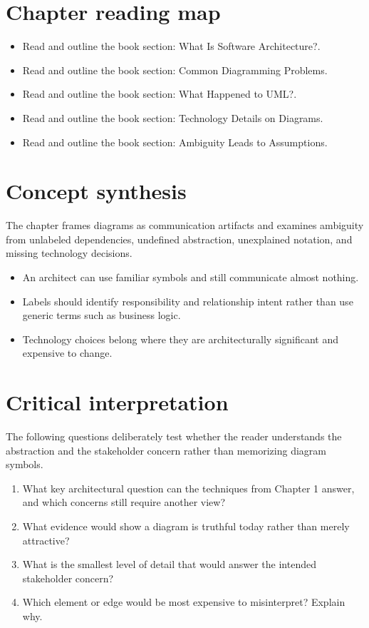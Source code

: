 \documentclass[10pt,letterpaper]{article}
\begin{document}
\section{Chapter reading map}
\begin{itemize}
\item Read and outline the book section: What Is Software Architecture?.
\item Read and outline the book section: Common Diagramming Problems.
\item Read and outline the book section: What Happened to UML?.
\item Read and outline the book section: Technology Details on Diagrams.
\item Read and outline the book section: Ambiguity Leads to Assumptions.
\end{itemize}

\section{Concept synthesis}
The chapter frames diagrams as communication artifacts and examines ambiguity from unlabeled dependencies, undefined abstraction, unexplained notation, and missing technology decisions.

\begin{itemize}
\item An architect can use familiar symbols and still communicate almost nothing.
\item Labels should identify responsibility and relationship intent rather than use generic terms such as business logic.
\item Technology choices belong where they are architecturally significant and expensive to change.
\end{itemize}

\section{Critical interpretation}
The following questions deliberately test whether the reader understands the abstraction and the stakeholder concern rather than memorizing diagram symbols.

\begin{enumerate}
\item What key architectural question can the techniques from Chapter 1 answer, and which concerns still require another view?
\item What evidence would show a diagram is truthful today rather than merely attractive?
\item What is the smallest level of detail that would answer the intended stakeholder concern?
\item Which element or edge would be most expensive to misinterpret? Explain why.
\end{enumerate}
\end{document}
